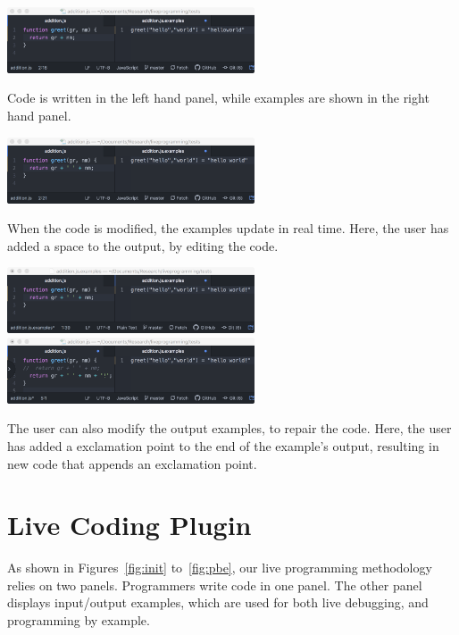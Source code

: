 \begin{marginfigure}
	\setlength{\abovecaptionskip}{0.1pt plus 0.1pt minus 0.1pt}
	\includegraphics[width=0.55\textwidth]{figures/initial_greet}
	\caption{Code is written in the left hand panel,
	while examples are shown in the right hand panel.}
	\label{fig:init}
\end{marginfigure}
\begin{marginfigure}
	\setlength{\abovecaptionskip}{0.1pt plus 0.1pt minus 0.1pt}
	\includegraphics[width=0.55\textwidth]{figures/manual_change}
	\caption{When the code is modified, the examples update in real time.
	Here, the user has added a space to the output, by editing the code.}
	\label{fig:man_change}
\end{marginfigure}
\begin{marginfigure}
	\setlength{\abovecaptionskip}{0.1pt plus 0.1pt minus 0.1pt}
	\includegraphics[width=0.55\textwidth]{figures/pbe_before}
	\includegraphics[width=0.55\textwidth]{figures/pbe_after}
	\caption{The user can also modify the output examples, to repair the code.  Here, the
	user has added a exclamation point to the end of the example's output, resulting in new code that appends an exclamation point.}
	\label{fig:pbe}
\end{marginfigure}

\section{Live Coding Plugin}
As shown in Figures~\ref{fig:init} to~\ref{fig:pbe}, our live programming methodology
relies on two panels.
Programmers write code in one panel.
The other panel displays input/output examples,
which are used for both live debugging,
and programming by example.


